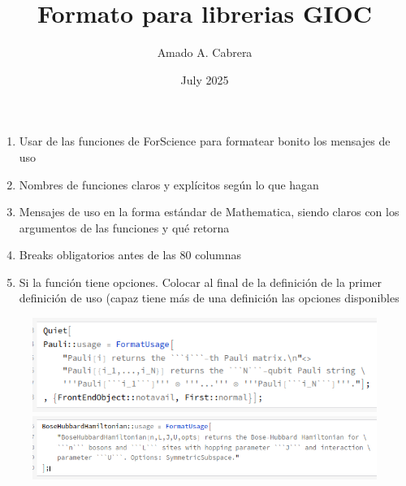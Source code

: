 \documentclass{article}
\title{Formato para librerias GIOC}
\author{Amado A. Cabrera}
\date{July 2025}
\begin{document}
\maketitle

\begin{enumerate}
\item Usar de las funciones de ForScience para formatear bonito los mensajes
de uso 
\item Nombres de funciones claros y explícitos según lo que hagan
\item Mensajes de uso en la forma estándar de Mathematica, siendo claros con 
los argumentos de las funciones y qué retorna
\item Breaks obligatorios antes de las 80 columnas
\item Si la función tiene opciones. Colocar al final de la definición de la primer
definición de uso (capaz tiene más de una definición las opciones disponibles
\end{enumerate}

\begin{figure}
\centering
\includegraphics[width=\textwidth]{estandar1.png}
\includegraphics[width=\textwidth]{estandar2.png}
\end{figure}
\end{document}
